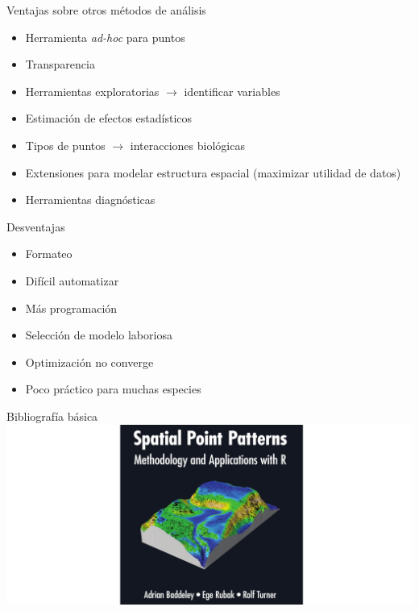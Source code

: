 \documentclass[
  11pt,
  ignorenonframetext,
]{beamer}
\providecommand{\tightlist}{%
  \setlength{\itemsep}{0pt}\setlength{\parskip}{0pt}}
\begin{document}
\begin{frame}{Ventajas sobre otros métodos de análisis}
\protect\hypertarget{ventajas-sobre-otros-muxe9todos-de-anuxe1lisis}{}
\begin{itemize}
\tightlist
\item
  Herramienta \emph{ad-hoc} para puntos
\item
  Transparencia
\item
  Herramientas exploratorias \(\rightarrow\) identificar variables
\item
  Estimación de efectos estadísticos
\item
  Tipos de puntos \(\rightarrow\) interacciones biológicas
\item
  Extensiones para modelar estructura espacial (maximizar utilidad de
  datos)
\item
  Herramientas diagnósticas
\end{itemize}
\end{frame}

\begin{frame}{Desventajas}
\protect\hypertarget{desventajas}{}
\begin{itemize}
\tightlist
\item
  Formateo
\item
  Difícil automatizar
\item
  Más programación
\item
  Selección de modelo laboriosa
\item
  Optimización no converge
\item
  Poco práctico para muchas especies
\end{itemize}
\end{frame}

\begin{frame}{Bibliografía básica}
\protect\hypertarget{bibliografuxeda-buxe1sica}{}
\includegraphics{Figuras/Spat-book.png}
\end{frame}
\end{document}
